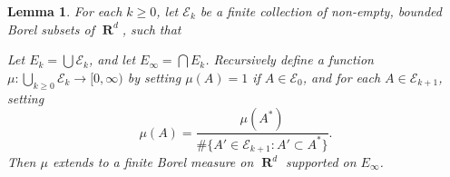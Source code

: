 \documentclass{article}
\DeclareMathOperator{\RR}{\mathbf{R}}
\theoremstyle{plain}
\newtheorem{lemma}[theorem]{Lemma}
\begin{document}
\begin{lemma}
    For each $k \geq 0$, let $\mathcal{E}_k$ be a finite collection of non-empty, bounded Borel subsets of $\RR^d$, such that
    Let $E_k = \bigcup \mathcal{E}_k$, and let $E_\infty = \bigcap E_k$. Recursively define a function $\mu: \bigcup_{k \geq 0} \mathcal{E}_k \to [0,\infty)$ by setting $\mu(A) = 1$ if $A \in \mathcal{E}_0$, and for each $A \in \mathcal{E}_{k+1}$, setting
    \[ \mu(A) = \frac{\mu(A^*)}{\# \{ A' \in \mathcal{E}_{k+1}: A' \subset A^* \}}. \]
    Then $\mu$ extends to a finite Borel measure on $\RR^d$ supported on $E_\infty$.
\end{lemma}
\end{document}
